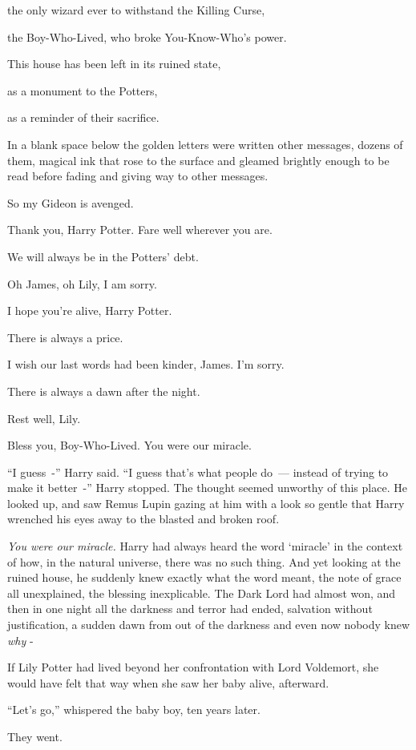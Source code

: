 the only wizard ever to withstand the Killing Curse,

the Boy-Who-Lived, who broke You-Know-Who's power.

This house has been left in its ruined state,

as a monument to the Potters,

as a reminder of their sacrifice.

In a blank space below the golden letters were written other messages, dozens of them, magical ink that rose to the surface and gleamed brightly enough to be read before fading and giving way to other messages.

So my Gideon is avenged.

Thank you, Harry Potter. Fare well wherever you are.

We will always be in the Potters' debt.

Oh James, oh Lily, I am sorry.

I hope you're alive, Harry Potter.

There is always a price.

I wish our last words had been kinder, James. I'm sorry.

There is always a dawn after the night.

Rest well, Lily.

Bless you, Boy-Who-Lived. You were our miracle.

``I guess~-'' Harry said. ``I guess that's what people do~--- instead of trying to make it better~-'' Harry stopped. The thought seemed unworthy of this place. He looked up, and saw Remus Lupin gazing at him with a look so gentle that Harry wrenched his eyes away to the blasted and broken roof.

\emph{You were our miracle.} Harry had always heard the word `miracle' in the context of how, in the natural universe, there was no such thing. And yet looking at the ruined house, he suddenly knew exactly what the word meant, the note of grace all unexplained, the blessing inexplicable. The Dark Lord had almost won, and then in one night all the darkness and terror had ended, salvation without justification, a sudden dawn from out of the darkness and even now nobody knew \emph{why} -

If Lily Potter had lived beyond her confrontation with Lord Voldemort, she would have felt that way when she saw her baby alive, afterward.

``Let's go,'' whispered the baby boy, ten years later.

They went.

